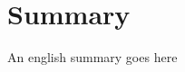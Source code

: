 \newpage
\chapter{Summary}
\chaptermark{}
\renewcommand{\chaptermark}[1]{\markboth{#1}{}}
\renewcommand{\sectionmark}[1]{\markright{#1}}
\fancyhead[RE]{\small}
\fancyhead[LO]{\small\rightmark}%

An english summary goes here
